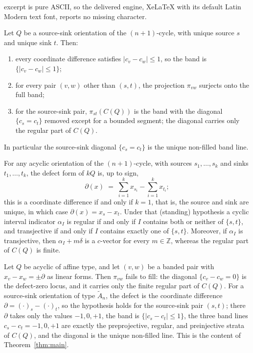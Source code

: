 \documentclass[10pt,a4paper]{amsart}
\newcommand{\ZZ}{\mathbb{Z}}
\begin{document}
excerpt is pure ASCII, so the delivered engine, XeLaTeX with its default Latin Modern text font, reports no missing character.
\begin{theorem}
\label{thm:main}
Let $Q$ be a source-sink orientation of the $(n+1)$-cycle, with unique source
$s$ and unique sink $t$. Then:
\begin{enumerate}[label=\textup{(\arabic*)}]
\item every coordinate difference satisfies $|c_v - c_w| \leq 1$, so the
  band is $\{|c_v - c_w| \leq 1\}$;
\item for every pair $(v, w)$ other than $(s, t)$, the projection
  $\pi_{vw}$ surjects onto the full band;
\item for the source-sink pair, $\pi_{st}(C(Q))$ is the band with the
  diagonal $\{c_s = c_t\}$ removed except for a bounded segment; the
  diagonal carries only the regular part of $C(Q)$.
\end{enumerate}
In particular the source-sink diagonal $\{c_s = c_t\}$ is the unique
non-filled band line.
\end{theorem}

\begin{lemma}
\label{lem:defect}
For any acyclic orientation of the $(n+1)$-cycle, with sources $s_1, \dots,
s_k$ and sinks $t_1, \dots, t_k$, the defect form of $kQ$ is, up to sign,
\[
  \partial(x) \;=\; \sum_{i=1}^{k} x_{s_i} - \sum_{i=1}^{k} x_{t_i};
\]
this is a coordinate difference if and only if $k = 1$, that is, the source
and sink are unique, in which case $\partial(x) = x_s - x_t$. Under that
\textup{(}standing\textup{)} hypothesis a cyclic interval indicator
$\alpha_I$ is regular if and only
if $I$ contains both or neither of $\{s, t\}$, and transjective if and
only if $I$ contains exactly one of $\{s, t\}$. Moreover, if $\alpha_I$ is
transjective, then $\alpha_I + m\delta$ is a $c$-vector for every
$m \in \ZZ$, whereas the regular part of $C(Q)$ is finite.
\end{lemma}

\begin{theorem}
\label{thm:defect_detection}
Let $Q$ be acyclic of affine type, and let $(v, w)$ be a banded pair with
$x_v - x_w = \pm\partial$ as linear forms. Then $\pi_{vw}$ fails to fill:
the diagonal $\{c_v - c_w = 0\}$ is the defect-zero locus, and it carries
only the finite regular part of $C(Q)$. For a source-sink orientation of type
$\widetilde{A}_n$, the defect is the coordinate difference
$\partial = (\cdot)_s - (\cdot)_t$, so the hypothesis holds for the
source-sink pair $(s, t)$; there $\partial$ takes only the values $-1, 0, +1$, the band is
$\{|c_s - c_t| \leq 1\}$, the three band lines $c_s - c_t = -1, 0, +1$
are exactly the preprojective, regular, and preinjective strata of
$C(Q)$, and the diagonal is the unique non-filled line. This is the
content of Theorem~\ref{thm:main}.
\end{theorem}
\end{document}
